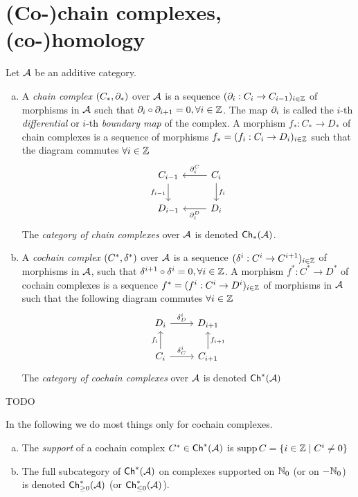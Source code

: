 \documentclass[a4paper]{report}
\begin{document}
\section{(Co-)chain complexes, (co-)homology}
Let $\mathcal{A}$ be an additive category.
\begin{defi}
  \begin{enumerate}[(a)]
  \item A \emph{chain complex} $(C_{*}, \partial_{*})$ over $\mathcal{A}$ is a sequence $(\partial_{i}: C_{i} \to C_{i-1})_{i \in \mathbb{Z}}$ of morphisms in $\mathcal{A}$ such that $\partial_{i} \circ \partial_{i+1} = 0, \forall i \in \mathbb{Z}$.
  The map $\partial_{i}$ is called the $i$-th \emph{differential} or $i$-th \emph{boundary map} of the complex.
  A morphism $f_{*}: C_{*} \to D_{*}$ of chain complexes is a sequence of morphisms $f_{*}= (f_{i}: C_{i} \to D_{i})_{i \in \mathbb{Z}}$ such that the diagram commutes $\forall i \in \mathbb{Z}$
  \[\begin{tikzcd}
C_{i-1} \arrow[d, "f_{i-1}"'] & C_i \arrow[d, "f_i"] \arrow[l, "\partial_i^C"'] \\
D_{i-1}                       & D_i \arrow[l, "\partial_i^D"]
\end{tikzcd}\]
The \emph{category of chain complexes} over $\mathcal{A}$ is denoted $\mathsf{Ch}_*(\mathcal{A})$.
    \item A \emph{cochain complex} $(C^{*}, \delta^{*})$ over $\mathcal{A}$ is a  sequence $(\delta^{i}: C^{i} \to C^{i+1})_{i \in \mathbb{Z}}$ of morphisms in $\mathcal{A}$, such that $\delta^{i+1} \circ\delta^{i}=0, \forall i \in \mathbb{Z}$. A morphism $f^{*}: C^{*} \to D^{*}$ of cochain complexes is a sequence $f^{*}=(f^{i}: C^{i} \to D^{i})_{i \in \mathbb{Z}}$ of morphisms in $\mathcal{A}$ such that the following diagram commutes $\forall i \in \mathbb{Z}$
          \[\begin{tikzcd}
D_i \arrow[r, "\delta_D^i"]                  & D_{i+1}                       \\
C_i \arrow[r, "\delta^i_C"] \arrow[u, "f_i"] & C_{i+1} \arrow[u, "f_{i+1}"']
\end{tikzcd}\]
          The \emph{category of cochain complexes} over $\mathcal{A}$ is denoted $\mathsf{Ch}^*(\mathcal{A})$
  \end{enumerate}

\end{defi}

\begin{exer}
TODO
\end{exer}
In the following we do most things only for cochain complexes.
\begin{defi}
  \begin{enumerate}[(a)]
    \item The \emph{support} of a cochain complex $C^{*} \in \mathsf{Ch}^*(\mathcal{A})$ is $\operatorname{supp} C = \{i \in \mathbb{Z} \mid C^{i} \ne 0\}$
    \item The full subcategory of $\mathsf{Ch}^*(\mathcal{A})$ on complexes supported on $\mathbb{N}_0$ (or on $-\mathbb{N}_0$) is denoted $\mathsf{Ch}^*_{\ge 0}(\mathcal{A})$ (or $\mathsf{Ch}^*_{\le 0}(\mathcal{A})$).
  \end{enumerate}
\end{defi}
\end{document}
